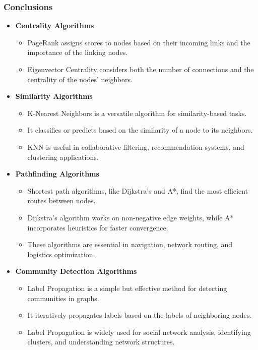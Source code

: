 \begin{frame}
  \frametitle{Conclusions}

  \begin{itemize}
    \item \textbf{Centrality Algorithms}
      \begin{itemize}
        \item PageRank assigns scores to nodes based on their incoming links and the importance of the linking nodes.
        \item Eigenvector Centrality considers both the number of connections and the centrality of the nodes' neighbors.
      \end{itemize}


    \item \textbf{Similarity Algorithms}
      \begin{itemize}
        \item K-Nearest Neighbors is a versatile algorithm for similarity-based tasks.
        \item It classifies or predicts based on the similarity of a node to its neighbors.
        \item KNN is useful in collaborative filtering, recommendation systems, and clustering applications.
      \end{itemize}


    \item \textbf{Pathfinding Algorithms}
      \begin{itemize}
        \item Shortest path algorithms, like Dijkstra's and A*, find the most efficient routes between nodes.
        \item Dijkstra's algorithm works on non-negative edge weights, while A* incorporates heuristics for faster convergence.
        \item These algorithms are essential in navigation, network routing, and logistics optimization.
      \end{itemize}


    \item \textbf{Community Detection Algorithms}
      \begin{itemize}
        \item Label Propagation is a simple but effective method for detecting communities in graphs.
        \item It iteratively propagates labels based on the labels of neighboring nodes.
        \item Label Propagation is widely used for social network analysis, identifying clusters, and understanding network structures.
      \end{itemize}
  \end{itemize}
\end{frame}